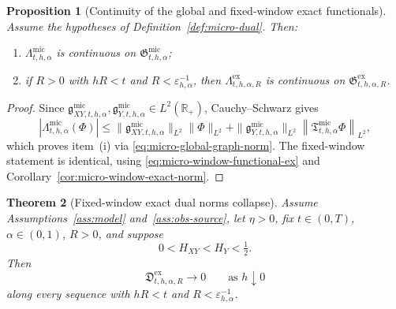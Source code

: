 \documentclass[11pt,a4paper]{amsart}
\theoremstyle{plain}
\newtheorem{theorem}{Theorem}[section]
\newtheorem{proposition}[theorem]{Proposition}
\theoremstyle{definition}
\theoremstyle{remark}
\newcommand{\R}{\mathbb{R}}
\begin{document}
\begin{proposition}[Continuity of the global and fixed-window exact functionals]
\label{prop:micro-dual-cont}
Assume the hypotheses of Definition~\ref{def:micro-dual}. Then:
\begin{enumerate}[label=(\roman*)]
\item \(\Lambda_{t,h,\alpha}^{\mathrm{mic}}\) is continuous on
\(\mathfrak G_{t,h,\alpha}^{\mathrm{mic}}\);
\item if \(R>0\) with \(hR<t\) and \(R<\varepsilon_{h,\alpha}^{-1}\), then
\(\Lambda_{t,h,\alpha,R}^{\mathrm{ex}}\) is continuous on
\(\mathfrak G_{t,h,\alpha,R}^{\mathrm{ex}}\).
\end{enumerate}
\end{proposition}

\begin{proof}
Since \(\mathfrak g_{XY,t,h,\alpha}^{\mathrm{mic}},\mathfrak g_{Y,t,h,\alpha}^{\mathrm{mic}}\in
L^2(\R_+)\), Cauchy--Schwarz gives
\[
\left|
\Lambda_{t,h,\alpha}^{\mathrm{mic}}(\Phi)
\right|
\le
\|\mathfrak g_{XY,t,h,\alpha}^{\mathrm{mic}}\|_{L^2}\|\Phi\|_{L^2}
+
\|\mathfrak g_{Y,t,h,\alpha}^{\mathrm{mic}}\|_{L^2}
\left\|
\mathfrak T_{t,h,\alpha}^{\mathrm{mic}}\Phi
\right\|_{L^2},
\]
which proves item~(i) via \eqref{eq:micro-global-graph-norm}. The fixed-window statement is
identical, using \eqref{eq:micro-window-functional-ex} and
Corollary~\ref{cor:micro-window-exact-norm}.
\end{proof}

\begin{theorem}[Fixed-window exact dual norms collapse]
\label{thm:micro-window-dual-collapse}
Assume Assumptions~\ref{ass:model} and~\ref{ass:obs-source}, let \(\eta>0\), fix \(t\in(0,T)\),
\(\alpha\in(0,1)\), \(R>0\), and suppose
\[
0<H_{XY}<H_Y<\tfrac12.
\]
Then
\begin{equation}\label{eq:micro-window-dual-collapse}
\mathfrak D_{t,h,\alpha,R}^{\mathrm{ex}}
\longrightarrow0
\qquad\text{as }h\downarrow0
\end{equation}
along every sequence with \(hR<t\) and \(R<\varepsilon_{h,\alpha}^{-1}\).
\end{theorem}
\end{document}
